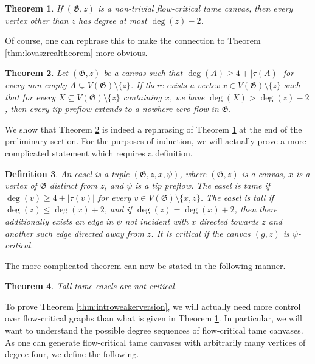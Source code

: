 \documentclass{article}
\newcommand\g{\mathfrak{G}}
\newtheorem{theorem}{Theorem}[section]
\newtheorem{definition}[theorem]{Definition}
\begin{document}
\begin{theorem}
\label{thm-deg}
If $(\g,z)$ is a non-trivial flow-critical tame canvas, then every vertex other than $z$ has degree at most $\deg(z) -2$.  
\end{theorem}

Of course, one can rephrase this to make the connection to Theorem \ref{thm:lovaszrealtheorem} more obvious.

\begin{theorem}\label{cor-tall}
Let $(\g,z)$ be a canvas such that $\deg(A)\ge 4+|\tau(A)|$ for every non-empty $A\subsetneq V(\g)\setminus\{z\}$. If there exists a vertex $x\in V(\g)\setminus \{z\}$ such that for every $X\subseteq V(\g)\setminus\{z\}$ containing $x$, we have $\deg(X)>\deg(z)-2$,  then every tip preflow extends to a nowhere-zero flow in $\g$.
\end{theorem} 

We show that Theorem \ref{cor-tall} is indeed a rephrasing of Theorem \ref{thm-deg} at the end of the preliminary section. For the purposes of induction, we will actually prove a more complicated statement which requires a definition.

\begin{definition}
 An \emph{easel} is a tuple $(\g,z,x,\psi)$, where
$(\g,z)$ is a canvas, $x$ is a vertex of $\g$ distinct from $z$, and $\psi$ is a tip preflow.
The easel is \emph{tame} if $\deg(v)\ge 4+|\tau(v)|$ for every $v\in V(\g)\setminus\{x,z\}$.
The easel is \emph{tall} if $\deg(z)\le \deg(x)+2$,
and if $\deg(z)=\deg(x)+2$, then there additionally exists an edge in $\psi$ not incident with $x$ directed towards
$z$ and another such edge directed away from $z$.
It is \emph{critical} if the canvas $(g,z)$ is $\psi$-critical.
\end{definition}

The more complicated theorem can now be stated in the following manner.

\begin{theorem}
\label{thm:tall}
    Tall tame easels are not critical.  
\end{theorem}

To prove Theorem \ref{thm:introweakerversion}, we will actually need more
control over flow-critical graphs than what is given in Theorem \ref{thm-deg}.
In particular, we will want to understand the possible degree sequences of flow-critical tame canvases. As one can generate
flow-critical tame canvases with arbitrarily many vertices of degree four,  we
define the following.
\end{document}
